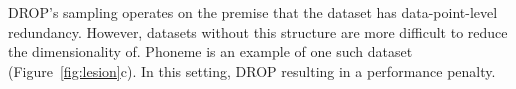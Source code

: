 DROP's sampling operates on the premise that the dataset has data-point-level redundancy. 
However, datasets without this structure are more difficult to reduce the dimensionality of.
Phoneme is an example of one such dataset (Figure~\ref{fig:lesion}c).  
In this setting, DROP  resulting in a performance penalty.

